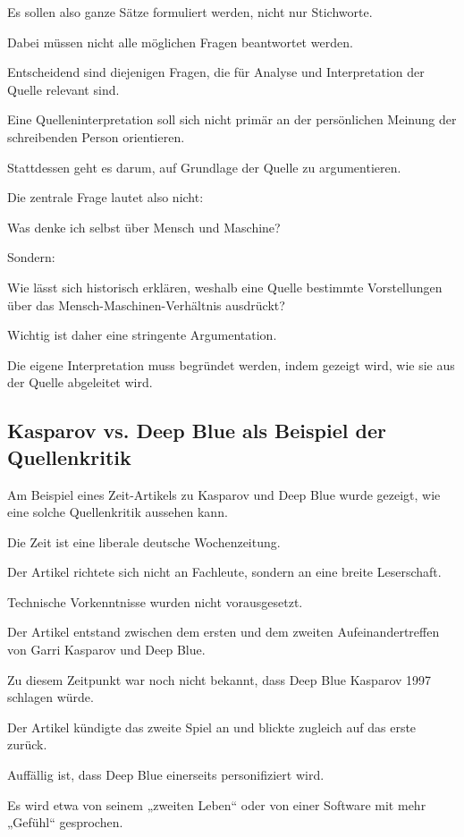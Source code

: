 Es sollen also ganze Sätze formuliert werden,
nicht nur Stichworte.

Dabei müssen nicht alle möglichen Fragen beantwortet werden.

Entscheidend sind diejenigen Fragen,
die für Analyse und Interpretation der Quelle relevant sind.

Eine Quelleninterpretation soll sich nicht primär
an der persönlichen Meinung
der schreibenden Person orientieren.

Stattdessen geht es darum,
auf Grundlage der Quelle zu argumentieren.

Die zentrale Frage lautet also nicht:

Was denke ich selbst über Mensch und Maschine?

Sondern:

Wie lässt sich historisch erklären,
weshalb eine Quelle bestimmte Vorstellungen
über das Mensch-Maschinen-Verhältnis ausdrückt?

Wichtig ist daher eine stringente Argumentation.

Die eigene Interpretation muss begründet werden,
indem gezeigt wird,
wie sie aus der Quelle abgeleitet wird.

\subsection{Kasparov vs. Deep Blue als Beispiel der Quellenkritik}

Am Beispiel eines Zeit-Artikels
zu Kasparov und Deep Blue wurde gezeigt,
wie eine solche Quellenkritik aussehen kann.

Die Zeit ist eine liberale deutsche Wochenzeitung.

Der Artikel richtete sich nicht an Fachleute,
sondern an eine breite Leserschaft.

Technische Vorkenntnisse wurden nicht vorausgesetzt.

Der Artikel entstand zwischen dem ersten
und dem zweiten Aufeinandertreffen
von Garri Kasparov und Deep Blue.

Zu diesem Zeitpunkt war noch nicht bekannt,
dass Deep Blue Kasparov 1997 schlagen würde.

Der Artikel kündigte das zweite Spiel an
und blickte zugleich auf das erste zurück.

Auffällig ist,
dass Deep Blue einerseits personifiziert wird.

Es wird etwa von seinem „zweiten Leben“
oder von einer Software mit mehr „Gefühl“ gesprochen.

